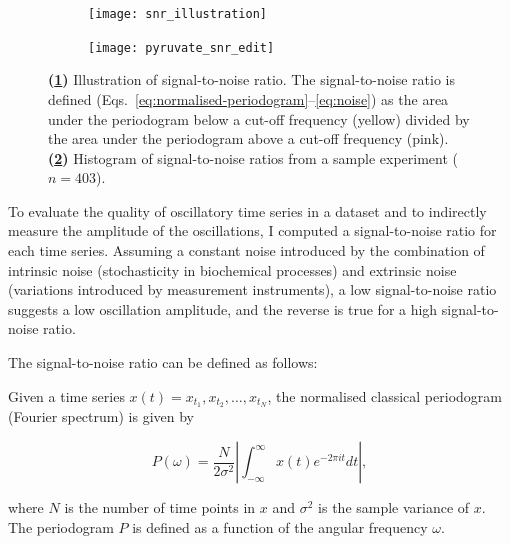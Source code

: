 \begin{figure}
  \centering
  \begin{subfigure}[htpb]{0.5\textwidth}
   \centering
   \texttt{[image: snr\_illustration]}
   \caption{
   }
   \label{fig:analysis-snr-illustration}
 \end{subfigure}%
 \begin{subfigure}[htpb]{0.5\textwidth}
   \centering
   \texttt{[image: pyruvate\_snr\_edit]}
   \caption{
   }
   \label{fig:analysis-snr-histogram-example}
  \end{subfigure}

  \caption{
    \textbf{(\ref{fig:analysis-snr-illustration})}
    Illustration of signal-to-noise ratio.
    The signal-to-noise ratio is defined (Eqs.\ \ref{eq:normalised-periodogram}--\ref{eq:noise}) as the area under the periodogram below a cut-off frequency (yellow) divided by the area under the periodogram above a cut-off frequency (pink).
    \textbf{(\ref{fig:analysis-snr-histogram-example})}
    Histogram of signal-to-noise ratios from a sample experiment ($n=403$).
  }
  \label{fig:analysis-snr}
\end{figure}

To evaluate the quality of oscillatory time series in a dataset and to indirectly measure the amplitude of the oscillations, I computed a signal-to-noise ratio for each time series.
Assuming a constant noise introduced by the combination of intrinsic noise (stochasticity in biochemical processes) and extrinsic noise (variations introduced by measurement instruments), a low signal-to-noise ratio suggests a low oscillation amplitude, and the reverse is true for a high signal-to-noise ratio.

The signal-to-noise ratio can be defined as follows:

Given a time series $x(t) = x_{t_{1}}, x_{t_{2}}, \ldots, x_{t_{N}}$, the normalised classical periodogram (Fourier spectrum) is given by

\begin{equation}
  P(\omega) = \frac{N}{2\sigma^{2}} \left|\int_{-\infty}^{\infty} x(t) e^{-2\pi it}dt \right|, %
  \label{eq:normalised-periodogram}
\end{equation}

where $N$ is the number of time points in $x$ and $\sigma^{2}$ is the sample variance of $x$.
The periodogram $P$ is defined as a function of the angular frequency $\omega$.


